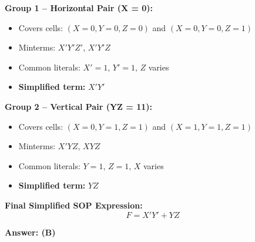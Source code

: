 \documentclass[a4paper,12pt]{article}
\begin{document}
\textbf{Group 1 – Horizontal Pair (X = 0):}
\begin{itemize}
    \item Covers cells: $(X=0, Y=0, Z=0)$ and $(X=0, Y=0, Z=1)$
    \item Minterms: $X'Y'Z'$, $X'Y'Z$
    \item Common literals: $X'=1$, $Y'=1$, $Z$ varies
    \item \textbf{Simplified term:} $X'Y'$
\end{itemize}
\hspace{-0.5em}
\textbf{Group 2 – Vertical Pair (YZ = 11):}
\begin{itemize}
    \item Covers cells: $(X=0, Y=1, Z=1)$ and $(X=1, Y=1, Z=1)$
    \item Minterms: $X'YZ$, $XYZ$
    \item Common literals: $Y=1$, $Z=1$, $X$ varies
    \item \textbf{Simplified term:} $YZ$
\end{itemize}

\bigskip

\textbf{Final Simplified SOP Expression:}
\[
F = X'Y' + YZ
\]

\textbf{Answer: (B)}
\end{document}
